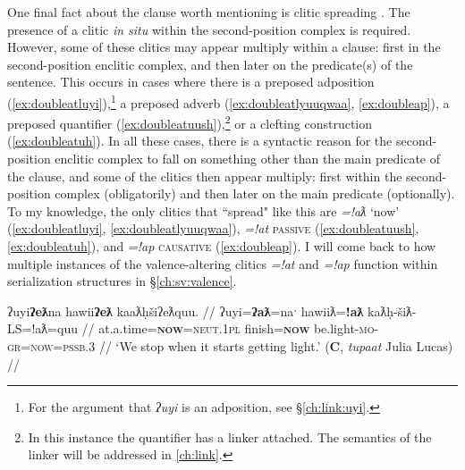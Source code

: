 One final fact about the clause worth mentioning is clitic spreading \citep[p.~254--255]{davidson2002}. The presence of a clitic \textit{in situ} within the second-position complex is required. However, some of these clitics may appear multiply within a clause: first in the second-position enclitic complex, and then later on the predicate(s) of the sentence. This occurs in cases where there is a preposed adposition (\ref{ex:doubleatluyi}),\footnote{For the argument that \textit{ʔuyi} is an adposition, see \S\ref{ch:link:uyi}.} a preposed adverb (\ref{ex:doubleatlyuuqwaa}, \ref{ex:doubleap}), a preposed quantifier (\ref{ex:doubleatuush}),\footnote{In this instance the quantifier has a linker attached. The semantics of the linker will be addressed in \cref{ch:link}.} or a clefting construction (\ref{ex:doubleatuh}). In all these cases, there is a syntactic reason for the second-position enclitic complex to fall on something other than the main predicate of the clause, and some of the clitics then appear multiply: first within the second-position complex (obligatorily) and then later on the main predicate (optionally). To my knowledge, the only clitics that ``spread" like this are \textit{=!aƛ} `now' (\ref{ex:doubleatluyi}, \ref{ex:doubleatlyuuqwaa}), \textit{=!at} \textsc{passive} (\ref{ex:doubleatuush}, \ref{ex:doubleatuh}), and \textit{=!ap} \textsc{causative} (\ref{ex:doubleap}). I will come back to how multiple instances of the valence-altering clitics \textit{=!at} and \textit{=!ap} function within serialization structures in \S\ref{ch:sv:valence}. %

\ex \label{ex:doubleatluyi}
\begingl
\glpreamble ʔuyi\textbf{ʔeƛ}na hawii\textbf{ʔeƛ} kaaƛḥšiʔeƛquu. //
\gla ʔuyi=\textbf{ʔaƛ}=naˑ hawiiƛ=\textbf{!aƛ} kaƛḥ-šiƛ-LS=!aƛ=quu  //
\glb at.a.time=\textbf{\textsc{now}}=\textsc{neut.1pl} finish=\textbf{\textsc{now}} be.light-\textsc{mo}-\textsc{gr}=\textsc{now}=\textsc{pssb.3} //
\glft `We stop when it starts getting light.' (\textbf{C}, \textit{tupaat} Julia Lucas) //
\endgl
\xe


